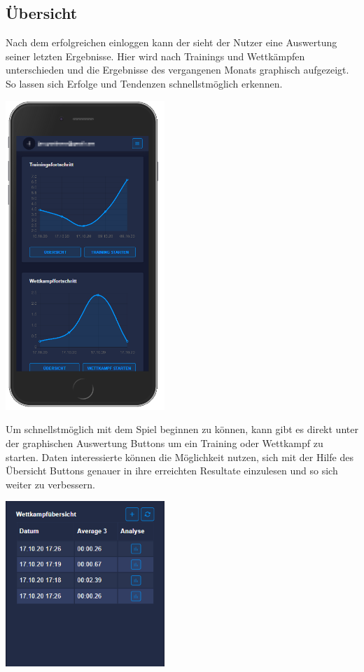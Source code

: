 \documentclass[a4paper]{article}
\theoremstyle{definition}
\begin{document}
\subsection*{Übersicht}
Nach dem erfolgreichen einloggen kann der sieht der Nutzer eine Auswertung seiner letzten Ergebnisse. Hier wird nach Trainings und Wettkämpfen unterschieden und die Ergebnisse des vergangenen Monats graphisch aufgezeigt. So lassen sich Erfolge und Tendenzen schnellstmöglich erkennen.
\begin{center}
	\includegraphics[width= 6cm, keepaspectratio]{img/overview}
\end{center}
Um schnellstmöglich mit dem Spiel beginnen zu können, kann gibt es direkt unter der graphischen Auswertung Buttons um ein Training oder Wettkampf zu starten. Daten interessierte können die Möglichkeit nutzen, sich mit der Hilfe des Übersicht Buttons genauer in ihre erreichten Resultate einzulesen und so sich weiter zu verbessern.
\begin{center}
	\includegraphics[width= 6cm, keepaspectratio]{img/competitionoverview}
\end{center}
\end{document}
